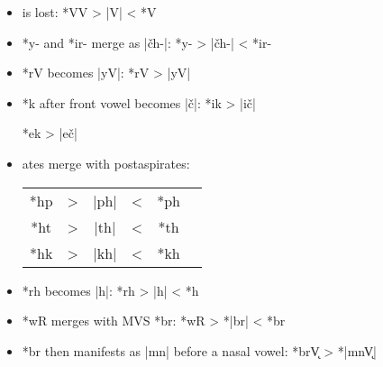 \documentclass[output=paper]{LSP/langsci}
\begin{document}
\begin{itemize}
\item {} is lost: \hspace{4.2em} *VV	>	|V|	<	*V

\item *y- and *ir- merge as |\v{c}h-|: \hspace{2em} *y-	>	|\v{c}h-|	<	*ir-

\item *rV becomes |yV|:	 \hspace{5.3em} *rV	>	|yV|

\item *k after front vowel becomes |\v{c}|: \hspace{1em} *ik	>	|i\v{c}|

\hspace{14.2em} *ek	>	|e\v{c}|

\item {}ates merge with postaspirates:



\begin{tabular}[t]{c c c c c c }
*hp & > & |ph| & < & *ph \\
*ht	& > & |th| & < & *th \\
*hk & > & |kh| & < & *kh \\
\end{tabular}

\item *rh becomes |h|: \hspace{4em} *rh	>	|h|	<	*h

\item *wR merges with MVS *br: \hspace{1em}*wR	>	*|br|	<	*br
\item  {} *br then manifests as |mn| before a nasal vowel:              *br\k{V}    >          *|mn\k{V}|
\end{itemize}

\end{document}
